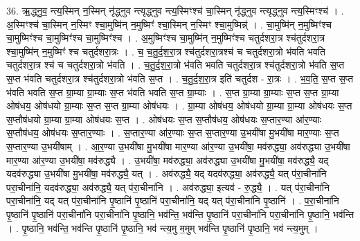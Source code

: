 \documentclass[17pt]{extarticle}
\begin{document}
36. ऋ॒द्ध्नु॒व॒ न्त्य॒स्मिन् न॒स्मिन् नृ॑द्ध्नुव न्त्यृद्ध्नुव न्त्य॒स्मिꣳश्च॑ चा॒स्मिन् नृ॑द्ध्नुव न्त्यृद्ध्नुव न्त्य॒स्मिꣳश्च॑ । . अ॒स्मिꣳश्च॑ चा॒स्मिन् न॒स्मिꣳ श्चा॒मुष्मि॑न् न॒मुष्मिꣳ॑ श्चा॒स्मिन् न॒स्मिꣳ श्चा॒मुष्मिन्न्॑ । . चा॒मुष्मि॑न् न॒मुष्मिꣳ॑श्च चा॒मुष्मिꣳ॑श्च चा॒मुष्मिꣳ॑श्च चा॒मुष्मिꣳ॑श्च । . अ॒मुष्मिꣳ॑श्च चा॒मुष्मि॑न् न॒मुष्मिꣳ॑श्च चतुर्दशरा॒त्र श्च॑तुर्दशरा॒त्र श्चा॒मुष्मि॑न् न॒मुष्मिꣳ॑ श्च चतुर्दशरा॒त्रः । . च॒ च॒तु॒र्द॒श॒रा॒त्र श्च॑तुर्दशरा॒त्रश्च॑ च चतुर्दशरा॒त्रो भ॑वति भवति चतुर्दशरा॒त्र श्च॑ च चतुर्दशरा॒त्रो भ॑वति । . च॒तु॒र्द॒श॒रा॒त्रो भ॑वति भवति चतुर्दशरा॒त्र श्च॑तुर्दशरा॒त्रो भ॑वति स॒प्त स॒प्त भ॑वति चतुर्दशरा॒त्र श्च॑तुर्दशरा॒त्रो भ॑वति स॒प्त । . च॒तु॒र्द॒श॒रा॒त्र इति॑ चतुर्दश - रा॒त्रः । . भ॒व॒ति॒ स॒प्त स॒प्त भ॑वति भवति स॒प्त ग्रा॒म्या ग्रा॒म्याः स॒प्त भ॑वति भवति स॒प्त ग्रा॒म्याः । . स॒प्त ग्रा॒म्या ग्रा॒म्याः स॒प्त स॒प्त ग्रा॒म्या ओष॑धय॒ ओष॑धयो ग्रा॒म्याः स॒प्त स॒प्त ग्रा॒म्या ओष॑धयः । . ग्रा॒म्या ओष॑धय॒ ओष॑धयो ग्रा॒म्या ग्रा॒म्या ओष॑धयः स॒प्त स॒प्तौष॑धयो ग्रा॒म्या ग्रा॒म्या ओष॑धयः स॒प्त । . ओष॑धयः स॒प्त स॒प्तौष॑धय॒ ओष॑धयः स॒प्तार॒ण्या आ॑र॒ण्याः स॒प्तौष॑धय॒ ओष॑धयः स॒प्तार॒ण्याः । . स॒प्तार॒ण्या आ॑र॒ण्याः स॒प्त स॒प्तार॒ण्या उ॒भयी॑षा मु॒भयी॑षा मार॒ण्याः स॒प्त स॒प्तार॒ण्या उ॒भयी॑षाम् । . आ॒र॒ण्या उ॒भयी॑षा मु॒भयी॑षा मार॒ण्या आ॑र॒ण्या उ॒भयी॑षा॒ मव॑रुद्ध्या॒ अव॑रुद्ध्या उ॒भयी॑षा मार॒ण्या आ॑र॒ण्या उ॒भयी॑षा॒ मव॑रुद्ध्यै । . उ॒भयी॑षा॒ मव॑रुद्ध्या॒ अव॑रुद्ध्या उ॒भयी॑षा मु॒भयी॑षा॒ मव॑रुद्ध्यै॒ यद् यदव॑रुद्ध्या उ॒भयी॑षा मु॒भयी॑षा॒ मव॑रुद्ध्यै॒ यत् । . अव॑रुद्ध्यै॒ यद् यदव॑रुद्ध्या॒ अव॑रुद्ध्यै॒ यत् प॑रा॒चीना॑नि परा॒चीना॑नि॒ यदव॑रुद्ध्या॒ अव॑रुद्ध्यै॒ यत् प॑रा॒चीना॑नि । . अव॑रुद्ध्या॒ इत्यव॑ - रु॒द्ध्यै॒ । . यत् प॑रा॒चीना॑नि परा॒चीना॑नि॒ यद् यत् प॑रा॒चीना॑नि पृ॒ष्ठानि॑ पृ॒ष्ठानि॑ परा॒चीना॑नि॒ यद् यत् प॑रा॒चीना॑नि पृ॒ष्ठानि॑ । . प॒रा॒चीना॑नि पृ॒ष्ठानि॑ पृ॒ष्ठानि॑ परा॒चीना॑नि परा॒चीना॑नि पृ॒ष्ठानि॒ भव॑न्ति॒ भव॑न्ति पृ॒ष्ठानि॑ परा॒चीना॑नि परा॒चीना॑नि पृ॒ष्ठानि॒ भव॑न्ति । . पृ॒ष्ठानि॒ भव॑न्ति॒ भव॑न्ति पृ॒ष्ठानि॑ पृ॒ष्ठानि॒ भव॑ न्त्य॒मु म॒मुम् भव॑न्ति पृ॒ष्ठानि॑ पृ॒ष्ठानि॒ भव॑ न्त्य॒मुम् । \newline
\pagebreak
{}
\end{document}
